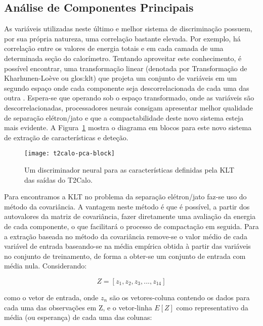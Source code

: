 \subsection{Análise de Componentes Principais}

As variáveis utilizadas neste último e melhor sistema de discriminação
possuem, por sua própria natureza, uma correlação bastante elevada. Por
exemplo, há correlação entre os valores de energia totais e em cada camada de
uma determinada seção do calorímetro. Tentando aproveitar este conhecimento, é
possível encontrar, uma transformação linear (denotada por Transformação de
Kharhunen-Loève ou \gls{glos:klt}) que projeta um conjunto de variáveis em um
segundo espaço onde cada componente seja descorrelacionada de cada uma das
outra \cite{haykin}. Espera-se que operando sob o espaço transformado, onde as
variáveis são descorrelacionadas, processadores neurais consigam apresentar
melhor qualidade de separação elétron/jato e que a compactabilidade deste novo
sistema esteja mais evidente. A Figura~\ref{fig:t2calo-pca} mostra o diagrama
em blocos para este novo sistema de extração de características e deteção.

\begin{figure}
\begin{center}
\texttt{[image: t2calo-pca-block]}
\end{center}
\caption{Um discriminador neural para as características definidas pela KLT
das saídas do T2Calo.}
\label{fig:t2calo-pca}
\end{figure}

Para encontramos a KLT no problema da separação elétron/jato faz-se uso do
método da covariância. A vantagem neste método é que é possível, a partir
dos autovalores da matriz de covariância, fazer diretamente uma avaliação da
energia de cada componente, o que facilitará o processo de compactação em
seguida. Para a extração baseada no método da covariância remove-se o valor
médio de cada variável de entrada baseando-se na média empírica obtida à
partir das variáveis no conjunto de treinamento, de forma a obter-se um
conjunto de entrada com média nula. Considerando:

\begin{equation}
Z = [z_1, z_2, z_3, ..., z_{14}]
\end{equation}

\noindent como o vetor de entrada, onde $z_n$ são os vetores-coluna contendo
os dados para cada uma das observações em Z, e o vetor-linha $E[Z]$ como
representativo da média (ou esperança) de cada uma das colunas:

